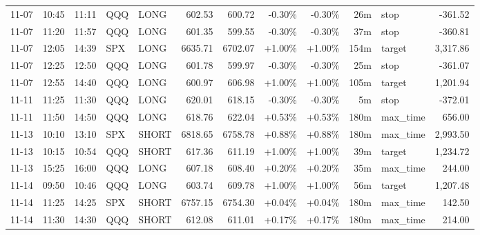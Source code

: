 \documentclass[11pt,a4paper]{article}
\begin{document}
\begin{center}
\begin{longtable}{>{\color{txtmain}}l l l l l r r r r r >{\color{txtmain}}l r}
11-07 & 10:45 & 11:11 & QQQ & LONG & 602.53 & 600.72 & \textcolor{lossred}{-0.30\%} & \textcolor{lossred}{-0.30\%} & 26m & stop & \textcolor{lossred}{-361.52} \\
11-07 & 11:20 & 11:57 & QQQ & LONG & 601.35 & 599.55 & \textcolor{lossred}{-0.30\%} & \textcolor{lossred}{-0.30\%} & 37m & stop & \textcolor{lossred}{-360.81} \\
11-07 & 12:05 & 14:39 & SPX & LONG & 6635.71 & 6702.07 & \textcolor{wingreen}{+1.00\%} & \textcolor{wingreen}{+1.00\%} & 154m & target & \textcolor{wingreen}{3,317.86} \\
11-07 & 12:25 & 12:50 & QQQ & LONG & 601.78 & 599.97 & \textcolor{lossred}{-0.30\%} & \textcolor{lossred}{-0.30\%} & 25m & stop & \textcolor{lossred}{-361.07} \\
11-07 & 12:55 & 14:40 & QQQ & LONG & 600.97 & 606.98 & \textcolor{wingreen}{+1.00\%} & \textcolor{wingreen}{+1.00\%} & 105m & target & \textcolor{wingreen}{1,201.94} \\
11-11 & 11:25 & 11:30 & QQQ & LONG & 620.01 & 618.15 & \textcolor{lossred}{-0.30\%} & \textcolor{lossred}{-0.30\%} & 5m & stop & \textcolor{lossred}{-372.01} \\
11-11 & 11:50 & 14:50 & QQQ & LONG & 618.76 & 622.04 & \textcolor{wingreen}{+0.53\%} & \textcolor{wingreen}{+0.53\%} & 180m & max\_time & \textcolor{wingreen}{656.00} \\
11-13 & 10:10 & 13:10 & SPX & SHORT & 6818.65 & 6758.78 & \textcolor{wingreen}{+0.88\%} & \textcolor{wingreen}{+0.88\%} & 180m & max\_time & \textcolor{wingreen}{2,993.50} \\
11-13 & 10:15 & 10:54 & QQQ & SHORT & 617.36 & 611.19 & \textcolor{wingreen}{+1.00\%} & \textcolor{wingreen}{+1.00\%} & 39m & target & \textcolor{wingreen}{1,234.72} \\
11-13 & 15:25 & 16:00 & QQQ & LONG & 607.18 & 608.40 & \textcolor{wingreen}{+0.20\%} & \textcolor{wingreen}{+0.20\%} & 35m & max\_time & \textcolor{wingreen}{244.00} \\
11-14 & 09:50 & 10:46 & QQQ & LONG & 603.74 & 609.78 & \textcolor{wingreen}{+1.00\%} & \textcolor{wingreen}{+1.00\%} & 56m & target & \textcolor{wingreen}{1,207.48} \\
11-14 & 11:25 & 14:25 & SPX & SHORT & 6757.15 & 6754.30 & \textcolor{wingreen}{+0.04\%} & \textcolor{wingreen}{+0.04\%} & 180m & max\_time & \textcolor{wingreen}{142.50} \\
11-14 & 11:30 & 14:30 & QQQ & SHORT & 612.08 & 611.01 & \textcolor{wingreen}{+0.17\%} & \textcolor{wingreen}{+0.17\%} & 180m & max\_time & \textcolor{wingreen}{214.00} \\

\end{longtable}
\end{center}
\end{document}
